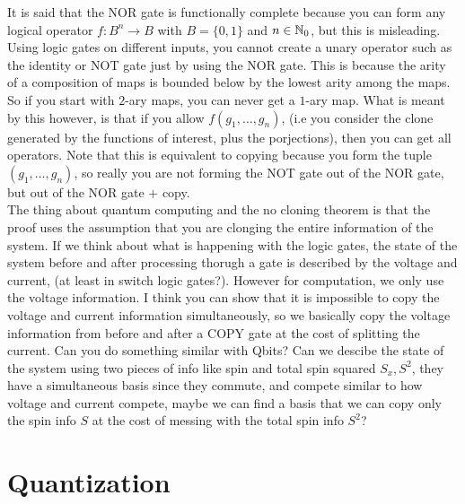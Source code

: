 \documentclass{book}
\begin{document}
	It is said that the NOR gate is functionally complete because you can form any logical operator $f:B^n \rightarrow B$ with $B=\{0,1\}$ and $n \in \mathbb{N}_0$, but this is misleading. Using logic gates on different inputs, you cannot create a unary operator such as the identity or NOT gate just by using the NOR gate. This is because the arity of a composition of maps is bounded below by the lowest arity among the maps. So if you start with $2$-ary maps, you can never get a $1$-ary map. What is meant by this however, is that if you allow $f(g_1, \ldots, g_n)$, (i.e you consider the clone generated by the functions of interest, plus the porjections), then you can get all operators. Note that this is equivalent to copying because you form the tuple $(g_1, \ldots, g_n)$, so really you are not forming the NOT gate out of the NOR gate, but out of the NOR gate $+$ copy. \\
	
	 The thing about quantum computing and the no cloning theorem is that the proof uses the assumption that you are clonging the entire information of the system. If we think about what is happening with the logic gates, the state of the system before and after processing thorugh a gate is described by the voltage and current, (at least in switch logic gates?). However for computation, we only use the voltage information. I think you can show that it is impossible to copy the voltage and current information simultaneously, so we basically copy the voltage information from before and after a COPY gate at the cost of splitting the current. Can you do something similar with Qbits? Can we descibe the state of the system using two pieces of info like spin and total spin squared $S_x, S^2$, they have a simultaneous basis since they commute, and compete similar to how voltage and current compete, maybe we can find a basis that we can copy only the spin info $S$ at the cost of messing with the total spin info $S^2$?
	
	
	
	\chapter{Quantization}
	
	
\end{document}
